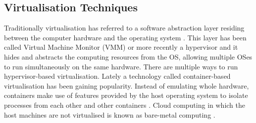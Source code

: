 \subsection{Virtualisation Techniques}

Traditionally virtualisation has referred to a software abstraction layer residing between the computer hardware and the operating system \cite{taxonomy}. This layer has been called Virtual Machine Monitor (VMM) or more recently a hypervisor and it hides and abstracts the computing resources from the OS, allowing multiple OSes to run simultaneously on the same hardware. There are multiple ways to run hypervisor-based virtualisation. Lately a technology called container-based virtualisation has been gaining popularity. Instead of emulating whole hardware, containers make use of features provided by the host operating system to isolate processes from each other and other containers \cite{eder2016hypervisor}. Cloud computing in which the host machines are not virtualised is known as bare-metal computing \cite{virtualisation_overhead}.

